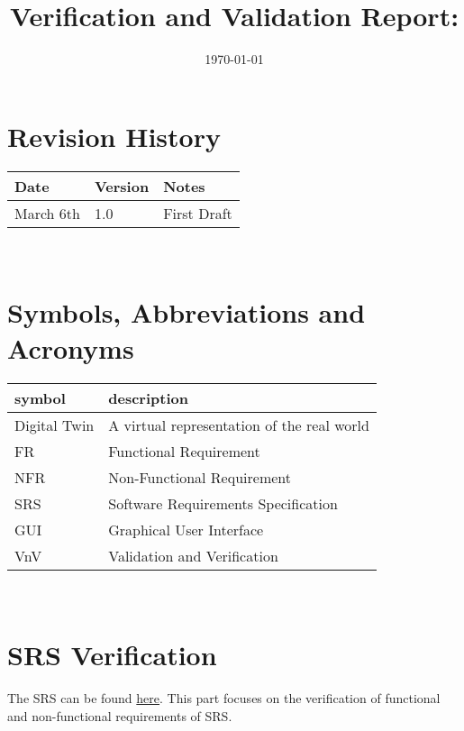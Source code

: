 \documentclass[12pt, titlepage]{article}
\begin{document}
\title{Verification and Validation Report: \progname} 
\author{\authname}
\date{\today}
	
\maketitle


\section{Revision History}

\begin{tabularx}{\textwidth}{p{3cm}p{2cm}X}
\toprule {\bf Date} & {\bf Version} & {\bf Notes}\\
\midrule
March 6th & 1.0 & First Draft\\
\bottomrule
\end{tabularx}

~\newpage

\section{Symbols, Abbreviations and Acronyms}

\renewcommand{\arraystretch}{1.2}
\begin{tabular}{|l | l|} 
  \toprule		
  \textbf{symbol} & \textbf{description}\\
  \midrule 
  Digital Twin & A virtual representation of the real world\\
  FR & Functional Requirement\\
  NFR & Non-Functional Requirement\\
  SRS & Software Requirements Specification\\
  GUI & Graphical User Interface \\
  VnV & Validation and Verification \\
  \bottomrule
\end{tabular}\\

\newpage

\tableofcontents

\listoftables %

\listoffigures %

\newpage

\section{SRS Verification}
The SRS can be found 
\href{https://github.com/wuj187/DigitalTwinCAS/blob/main/docs/SRS/SRS.pdf}{here}.
This part focuses on the verification of functional and non-functional requirements 
of SRS.
\end{document}
